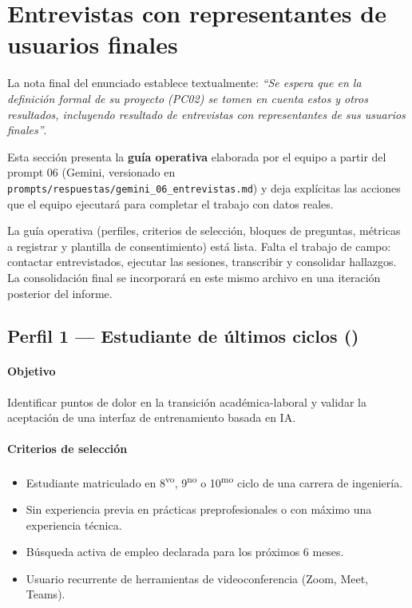 \section{Entrevistas con representantes de usuarios finales}
\label{sec:entrevistas}

La nota final del enunciado establece textualmente:
\textit{``Se espera que en la definición formal de su proyecto (PC02)
se tomen en cuenta estos y otros resultados, incluyendo resultado de
entrevistas con representantes de sus usuarios finales''}.

Esta sección presenta la \textbf{guía operativa} elaborada por el
equipo a partir del prompt 06 (Gemini, versionado en
\texttt{prompts/respuestas/gemini\_06\_entrevistas.md}) y deja
explícitas las acciones que el equipo ejecutará para completar el
trabajo con datos reales.

\begin{cajaPrompt}[title={Estado actual --- pendiente de ejecución de campo}]
La guía operativa (perfiles, criterios de selección, bloques de
preguntas, métricas a registrar y plantilla de consentimiento) está
lista. Falta el trabajo de campo: contactar entrevistados, ejecutar
las sesiones, transcribir y consolidar hallazgos. La consolidación
final se incorporará en este mismo archivo en una iteración posterior
del informe.
\end{cajaPrompt}

\subsection{Perfil 1 --- Estudiante de últimos ciclos ()}

\paragraph{Objetivo} Identificar puntos de dolor en la transición
académica-laboral y validar la aceptación de una interfaz de
entrenamiento basada en IA.

\paragraph{Criterios de selección}
\begin{itemize}
  \item Estudiante matriculado en 8\textsuperscript{vo},
        9\textsuperscript{no} o 10\textsuperscript{mo} ciclo de una
        carrera de ingeniería.
  \item Sin experiencia previa en prácticas preprofesionales o con
        máximo una experiencia técnica.
  \item Búsqueda activa de empleo declarada para los próximos 6 meses.
  \item Usuario recurrente de herramientas de videoconferencia
        (Zoom, Meet, Teams).
\end{itemize}

